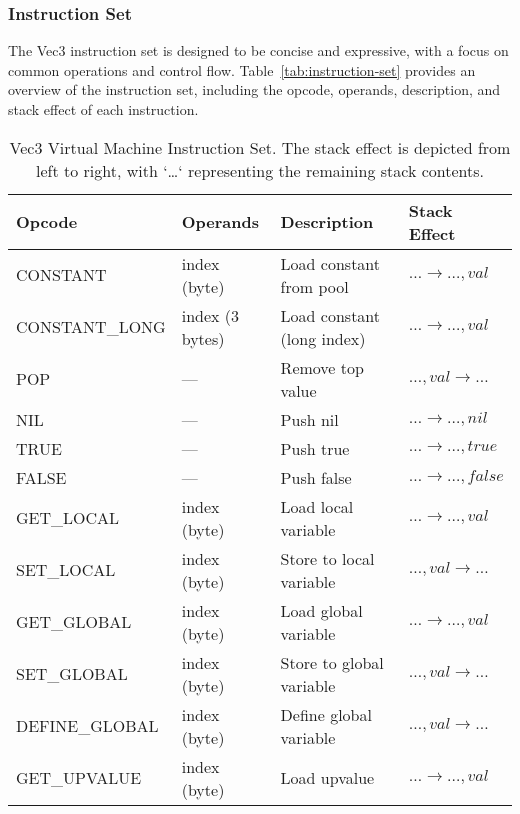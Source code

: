 \subsubsection{Instruction Set}

The Vec3 instruction set is designed to be concise and expressive, with a focus on common operations and control flow.
Table~\ref{tab:instruction-set} provides an overview of the instruction set, including the opcode, operands, description, and stack effect of each instruction.

\begin{table}[h]
    \caption{Vec3 Virtual Machine Instruction Set. The stack effect is depicted from left to right, with `\ldots` representing the remaining stack contents.}
    \begin{tabularx}{\textwidth}{|X|X|X|X|}
        \hline
        \textbf{Opcode} & \textbf{Operands} & \textbf{Description} & \textbf{Stack Effect} \\
        \hline \hline
        CONSTANT & index (byte) & Load constant from pool & $\dots \rightarrow \dots, val$ \\
        \hline
        CONSTANT\_LONG & index (3 bytes) & Load constant (long index) & $\dots \rightarrow \dots, val$ \\
        \hline
        POP & --- & Remove top value & $\dots, val \rightarrow \dots$ \\
        \hline
        NIL & --- & Push nil & $\dots \rightarrow \dots, nil$ \\
        \hline
        TRUE & --- & Push true & $\dots \rightarrow \dots, true$ \\
        \hline
        FALSE & --- & Push false & $\dots \rightarrow \dots, false$ \\
        \hline
        GET\_LOCAL & index (byte) & Load local variable & $\dots \rightarrow \dots, val$ \\
        \hline
        SET\_LOCAL & index (byte) & Store to local variable & $\dots, val \rightarrow \dots$ \\
        \hline
        GET\_GLOBAL & index (byte) & Load global variable & $\dots \rightarrow \dots, val$ \\
        \hline
        SET\_GLOBAL & index (byte) & Store to global variable & $\dots, val \rightarrow \dots$ \\
        \hline
        DEFINE\_GLOBAL & index (byte) & Define global variable & $\dots, val \rightarrow \dots$ \\
        \hline
        GET\_UPVALUE & index (byte) & Load upvalue & $\dots \rightarrow \dots, val$ \\

\end{tabularx}
\end{table}
